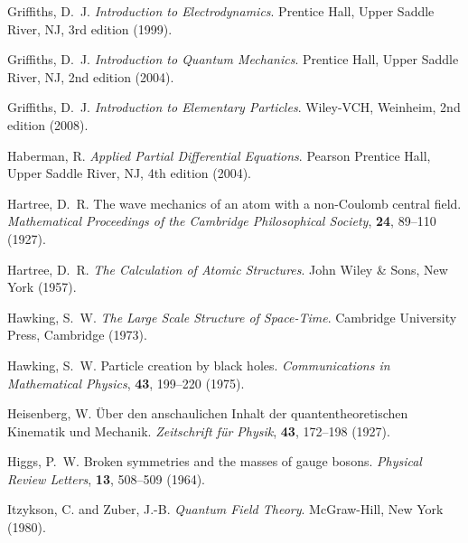 \documentclass[12pt,a4paper]{article}
\begin{document}
\begin{thebibliography}{99}
		Griffiths, D.~J.
		\newblock \textit{Introduction to Electrodynamics}.
		\newblock Prentice Hall, Upper Saddle River, NJ, 3rd edition (1999).
		
		Griffiths, D.~J.
		\newblock \textit{Introduction to Quantum Mechanics}.
		\newblock Prentice Hall, Upper Saddle River, NJ, 2nd edition (2004).
		
		Griffiths, D.~J.
		\newblock \textit{Introduction to Elementary Particles}.
		\newblock Wiley-VCH, Weinheim, 2nd edition (2008).
		
		Haberman, R.
		\newblock \textit{Applied Partial Differential Equations}.
		\newblock Pearson Prentice Hall, Upper Saddle River, NJ, 4th edition (2004).
		
		Hartree, D.~R.
		\newblock The wave mechanics of an atom with a non-Coulomb central field.
		\newblock \textit{Mathematical Proceedings of the Cambridge Philosophical Society}, \textbf{24}, 89--110 (1927).
		\newblock {}
		
		Hartree, D.~R.
		\newblock \textit{The Calculation of Atomic Structures}.
		\newblock John Wiley \& Sons, New York (1957).
		
		Hawking, S.~W.
		\newblock \textit{The Large Scale Structure of Space-Time}.
		\newblock Cambridge University Press, Cambridge (1973).
		
		Hawking, S.~W.
		\newblock Particle creation by black holes.
		\newblock \textit{Communications in Mathematical Physics}, \textbf{43}, 199--220 (1975).
		\newblock {}
		
		Heisenberg, W.
		\newblock Über den anschaulichen Inhalt der quantentheoretischen Kinematik und Mechanik.
		\newblock \textit{Zeitschrift für Physik}, \textbf{43}, 172--198 (1927).
		\newblock {}
		
		Higgs, P.~W.
		\newblock Broken symmetries and the masses of gauge bosons.
		\newblock \textit{Physical Review Letters}, \textbf{13}, 508--509 (1964).
		\newblock {}
		
		Itzykson, C. and Zuber, J.-B.
		\newblock \textit{Quantum Field Theory}.
		\newblock McGraw-Hill, New York (1980).
		

\end{thebibliography}
\end{document}
